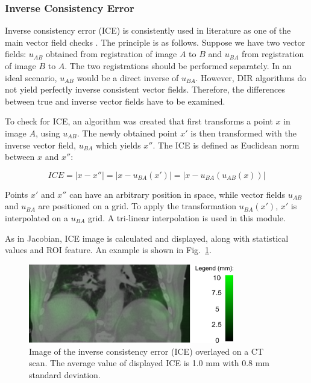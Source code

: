 \subsubsection{Inverse Consistency Error}
\label{ICE}

Inverse consistency error (ICE) is consistently used in literature as one of the main vector field checks \cite{Christensen2001, Bender2009}. The principle is as follows. Suppose we have two vector fields: $u_{AB}$ obtained from registration of image $A$ to $B$ and $u_{BA}$ from registration of image $B$ to $A$. The two registrations
should be performed separately. In an ideal scenario, $u_{AB}$ would be a direct inverse of $u_{BA}$. However, DIR algorithms do not yield perfectly inverse consistent vector fields. Therefore, the differences between true and inverse vector fields have to be examined.


To check for ICE, an algorithm was created that first transforms a point $x$ in image $A$, using $u_{AB}$. The newly obtained point $x'$ is then transformed with the inverse vector
field, $u_{BA}$ which yields $x''$. The ICE is defined as Euclidean norm between $x$ and $x''$:

\begin{equation}
\label{eq:ice}
ICE = |x - x''| = |x - u_{BA}(x')| = |x - u_{BA}(u_{AB}(x))|
\end{equation}

Points $x'$ and $x''$ can have an arbitrary position in space, while vector fields $u_{AB}$ and $u_{BA}$ are positioned on a grid. To apply the transformation $u_{BA}(x')$, $x'$ is interpolated on a $u_{BA}$ grid. A tri-linear interpolation is used in this module.

As in Jacobian, ICE image is calculated and displayed, along with statistical values and ROI feature. An example is shown in Fig.~\ref{inv}.




\begin{figure}[H]
\begin{center}
\includegraphics[width=0.8\textwidth]{./Vmm/Images/inv.png}
\caption{Image of the inverse consistency error (ICE) overlayed on a CT scan. The average value of displayed ICE is 1.0 mm with 0.8 mm standard deviation.}
\label{inv}
\end{center}
\end{figure}


